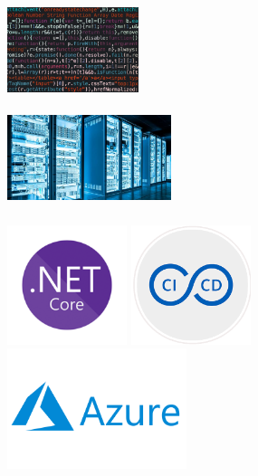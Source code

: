 \documentclass{beamer}
\begin{document}

\begin{frame}
\frametitle{\textbf{}}

    \includegraphics[height=25mm]{codeblock.jpg} \\

    \scalebox{5}{$\Downarrow$} \\

    \includegraphics[height=25mm]{server.jpg}

\end{frame}

\begin{frame}
\frametitle{\textbf{}}

    \includegraphics[height=35mm]{aspnet-core.png}
    \includegraphics[height=35mm]{cicd.png} \\
    \includegraphics[height=35mm]{azure.png}

\end{frame}
\end{document}
